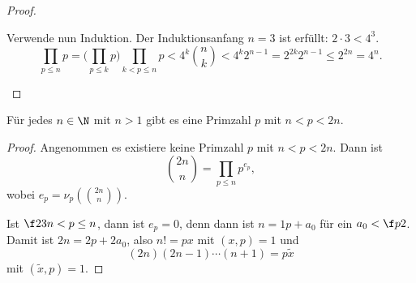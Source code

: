 \begin{lem}
\begin{proof}
\begin{enumerate}[a)]
				Verwende nun Induktion.
				Der Induktionsanfang $n = 3$ ist erfüllt: $2 \cdot 3 < 4^3$.
				\[
					\prod_{p \le n} p
					= \Big(\prod_{p \le k} p\Big) \prod_{k < p \le n} p
					< 4^k \binom{n}{k}
					< 4^k 2^{n-1}
					= 2^{2k} 2^{n-1}
					\le 2^{2n}
					= 4^n.
				\]
		\end{enumerate}
	\end{proof}
\end{lem}


\begin{st} \label{7.9}
	Für jedes $n \in \N$ mit $n > 1$ gibt es eine Primzahl $p$ mit $n < p < 2n$.
	\begin{proof}
		Angenommen es existiere keine Primzahl $p$ mit $n < p < 2n$.
		Dann ist
		\[
			\binom {2n}{n}
			= \prod_{p \le n} p^{e_p},
		\]
		wobei $e_p = \nu_p(\binom{2n}{n})$.

		Ist $\f 23 n < p \le n$, dann ist $e_p = 0$, denn dann ist $n = 1p + a_0$ für ein $a_0 < \f p2$.
		Damit ist $2n = 2p + 2a_0$, also $n! = px$ mit $(x,p) = 1$ und
		\[
			(2n)(2n-1)\dotsb (n+1) = p \tilde x
		\]
		mit $(\tilde x, p) = 1$.


\end{proof}
\end{st}
